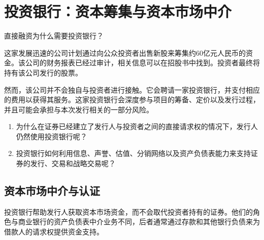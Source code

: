 \chapter{投资银行：资本筹集与资本市场中介}
\label{chap:Investment_Banks_Capital_Raising_and_Capital_Market_Intermediation}

\begin{openingcase}{直接融资为什么需要投资银行？}

这家发展迅速的公司计划通过向公众投资者出售新股来筹集约60亿元人民币的资金。该公司的财务报表已经过审计，相关信息可以在招股书中找到。投资者最终将持有该公司发行的股票。

然而，该公司并不会独自与投资者进行接触。它会聘请一家投资银行，并支付相应的费用以获得其服务。这家投资银行会深度参与项目的筹备、定价以及发行过程，并且可能会承担与本次发行相关的一部分风险。

\end{openingcase}

\begin{tcolorbox}[
  enhanced,
  colback=FinanceBlue!6,
  colframe=FinanceBlue,
  boxrule=0.6pt,
  sharp corners,
  left=8pt,
  right=8pt,
  top=7pt,
  bottom=7pt,
  before skip=1em,
  after skip=1.6em,
  title=\textbf{核心问题},
  coltitle=white,
  colbacktitle=FinanceBlue,
  fonttitle=\bfseries,
  attach boxed title to top left={xshift=6pt,yshift=-2mm},
  boxed title style={
    boxrule=0pt,
    sharp corners,
    left=5pt,
    right=5pt,
    top=2pt,
    bottom=2pt
  }
]
\begin{enumerate}[
  leftmargin=*,
  label=\textcolor{FinanceBlue}{\textbf{\arabic*.}},
  itemsep=0.55em,
  topsep=0.2em
]

\item 为什么在证券已经建立了发行人与投资者之间的直接请求权的情况下，发行人仍然使用投资银行呢？

\item 投资银行如何利用信息、声誉、估值、分销网络以及资产负债表能力来支持证券的发行、交易和战略交易呢？

\end{enumerate}
\end{tcolorbox}

\section{资本市场中介与认证}

投资银行帮助发行人获取资本市场资金，而不会取代投资者持有的证券。他们的角色与商业银行的资产负债表中介业务不同，后者通常通过存款和其他银行负债来为借款人的请求权提供资金支持。

